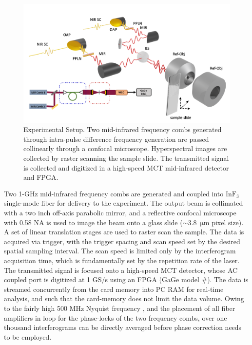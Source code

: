 \documentclass{optica-article}
\begin{document}
\begin{figure}[h]
    \centering
    \includegraphics[width=\linewidth]{setup_3D.png}
    \caption{Experimental Setup. Two mid-infrared frequency combs generated through intra-pulse difference frequency generation are passed collinearly through a confocal microscope. Hyperspectral images are collected by raster scanning the sample slide. The transmitted signal is collected and digitized in a high-speed MCT mid-infrared detector and FPGA.}
    \label{fig:setup}
\end{figure}

Two 1-GHz mid-infrared frequency combs are generated and coupled into $\mathrm{InF_3}$ single-mode fiber for delivery to the experiment. The output beam is collimated with a two inch off-axis parabolic mirror, and a reflective confocal microscope with 0.58 NA is used to image the beam onto a glass slide (\mbox{$\sim$3.8 $\mathrm{\mu m}$} pixel size). A set of linear translation stages are used to raster scan the sample. The data is acquired via trigger, with the trigger spacing and scan speed set by the desired spatial sampling interval. The scan speed is limited only by the interferogram acquisition time, which is fundamentally set by the repetition rate of the laser. The transmitted signal is focused onto a high-speed MCT detector, whose AC coupled port is digitized at 1 GS/s using an FPGA (GaGe model \#). The data is streamed concurrently from the card memory into PC RAM for real-time analysis, and such that the card-memory does not limit the data volume. Owing to the fairly high 500 MHz Nyquist frequency \cite{hebertSelfcorrectedChipbasedDualcomb2017,hebertSelfCorrectionLimitsDualComb2019}, and the placement of all fiber amplifiers in loop for the phase-locks of the two frequency combs, over one thousand interferograms can be directly averaged before phase correction needs to be employed.
\end{document}

